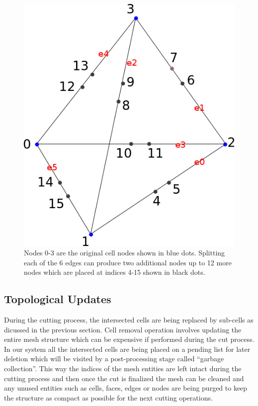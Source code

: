 \begin{figure}[H]
  \centering
  \includegraphics[width=0.6\linewidth]{figures/cutting/midpoints.png}
  \caption{\label{fig:midpoints}
  {Nodes 0-3 are the original cell nodes shown in blue dots. Splitting each of the 6 edges can produce two additional nodes up to 12 more nodes which 
  are placed at indices 4-15 shown in black dots.}
}
\end{figure}

\subsection{Topological Updates}
During the cutting process, the intersected cells are being replaced by sub-cells as dicussed in the previous section. Cell removal operation involves updating the entire 
mesh structure which can be expensive if performed during the cut process. In our system all the intersected cells are being placed on a pending list for later deletion 
which will be visited by a post-processing stage called ``garbage collection''. This way the indices of the mesh entities are left intact during the cutting process and 
then once the cut is finalized the mesh can be cleaned and any unused entities such as cells, faces, edges or nodes are being purged to keep the structure as compact as 
possible for the next cutting operations.

